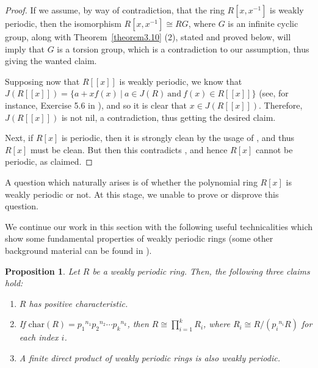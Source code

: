 \documentclass[12pt]{amsart}
\newtheorem{prop}[thm]{Proposition}
\theoremstyle{definition}
\theoremstyle{remark}
\numberwithin{equation}{section}
\begin{document}
\begin{proof} If we assume, by way of contradiction, that the ring $R[x,x^{-1}]$ is weakly periodic, then the isomorphism $R[x,x^{-1}] \cong RG$, where $G$ is an infinite cyclic group, along with Theorem~\ref{theorem3.10} (2), stated and proved below, will imply that $G$ is a torsion group, which is a contradiction to our assumption, thus giving the wanted claim.

Supposing now that $R[[x]]$ is weakly periodic, we know that $J(R[[x]])=\{a+xf(x) ~|~ a \in J(R)~ \mathrm{and} ~f(x) \in R[[x]]\}$ (see, for instance, Exercise 5.6 in \cite{L}), and so it is clear that $x \in J(R[[x]])$. Therefore, $J(R[[x]])$ is not nil, a contradiction, thus getting the desired claim.

Next, if $R[x]$ is periodic, then it is strongly clean by the usage of \cite[Proposition 2.5]{BCL}, and thus $R[x]$ must be clean. But then this contradicts \cite[Remark 2.8]{kanwar2015clean}, and hence $R[x]$ cannot be periodic, as claimed.
\end{proof}

A question which naturally arises is of whether the polynomial ring $R[x]$ is weakly periodic or not. At this stage, we unable to prove or disprove this question.

\medskip

We continue our work in this section with the following useful technicalities which show some fundamental properties of weakly periodic rings (some other background material can be found in \cite{CS}).

\begin{prop}\label{proposition1.6}
Let $R$ be a weakly periodic ring. Then, the following three claims hold:
\begin{enumerate}
\item[\rm{(1)}]
$R$ has positive characteristic.
\item[\rm{(2)}]
If $\mathrm{char}(R)={p_1}^{n_1}{p_2}^{n_2} \cdots {p_k}^{n_k}$, then $R \cong \prod_{i=1}^k R_i$, where $R_i\cong R/({p_i}^{n_i}R)$ for each index $i$.
\item[\rm{(3)}]
A finite direct product of weakly periodic rings is also weakly periodic.
\end{enumerate}
\end{prop}
\end{document}
